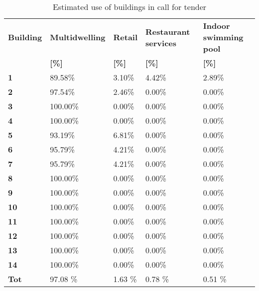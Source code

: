 \begin{table}[h!]
\centering
\caption{Estimated use of buildings in call for tender}\vspace{2mm}
\label{tab:ppa_buildinguse}
\begin{tabular}{lllll}
\toprule
\textbf{Building} & \textbf{Multidwelling} & \textbf{Retail} & \textbf{Restaurant services} & \textbf{Indoor swimming pool} \\
                  & \textbf{[\%]}               & \textbf{[\%]}      & \textbf{[\%]}          & \textbf{[\%]}              \\
                  \midrule
\textbf{1}        & 89.58\%                     & 3.10\%             & 4.42\%                 & 2.89\%                     \\
\textbf{2}        & 97.54\%                     & 2.46\%             & 0.00\%                 & 0.00\%                     \\
\textbf{3}        & 100.00\%                    & 0.00\%             & 0.00\%                 & 0.00\%                     \\
\textbf{4}        & 100.00\%                    & 0.00\%             & 0.00\%                 & 0.00\%                     \\
\textbf{5}        & 93.19\%                     & 6.81\%             & 0.00\%                 & 0.00\%                     \\
\textbf{6}        & 95.79\%                     & 4.21\%             & 0.00\%                 & 0.00\%                     \\
\textbf{7}        & 95.79\%                     & 4.21\%             & 0.00\%                 & 0.00\%                     \\
\textbf{8}        & 100.00\%                    & 0.00\%             & 0.00\%                 & 0.00\%                     \\
\textbf{9}        & 100.00\%                    & 0.00\%             & 0.00\%                 & 0.00\%                     \\
\textbf{10}       & 100.00\%                    & 0.00\%             & 0.00\%                 & 0.00\%                     \\
\textbf{11}       & 100.00\%                    & 0.00\%             & 0.00\%                 & 0.00\%                     \\
\textbf{12}       & 100.00\%                    & 0.00\%             & 0.00\%                 & 0.00\%                     \\
\textbf{13}       & 100.00\%                    & 0.00\%             & 0.00\%                 & 0.00\%                     \\
\textbf{14}       & 100.00\%                    & 0.00\%             & 0.00\%                 & 0.00\%                     \\ \midrule
\textbf{Tot}	  & 97.08 \%					& 1.63 \%			& 0.78 \%					& 0.51 \%					\\
\bottomrule
\end{tabular}
\end{table}